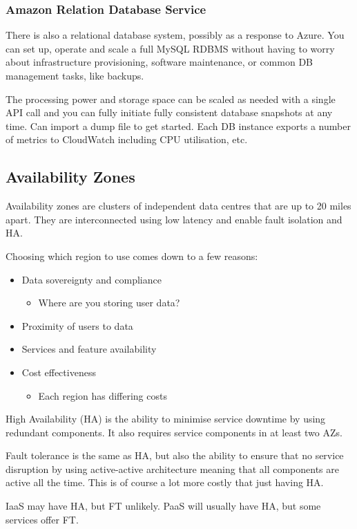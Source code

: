 \documentclass[11pt,a4paper,titlepage,dvipsnames,cmyk]{scrartcl}
\begin{document}
\subsubsection{Amazon Relation Database Service}
There is also a relational database system, possibly as a response to Azure. You can set up, operate and scale a full MySQL RDBMS without having to worry about infrastructure provisioning, software maintenance, or common DB management tasks, like backups.

The processing power and storage space can be scaled as needed with a single API call and you can fully initiate fully consistent database snapshots at any time. Can import a dump file to get started. Each DB instance exports a number of metrics to CloudWatch including CPU utilisation, etc.

\subsection{Availability Zones}
Availability zones are clusters of independent data centres that are up to 20 miles apart. They are interconnected using low latency and enable fault isolation and HA.

Choosing which region to use comes down to a few reasons:
\begin{itemize}
    \item Data sovereignty and compliance
    \begin{itemize}
        \item Where are you storing user data?
    \end{itemize}
    \item Proximity of users to data
    \item Services and feature availability
    \item Cost effectiveness
    \begin{itemize}
        \item Each region has differing costs
    \end{itemize}
\end{itemize}

High Availability (HA) is the ability to minimise service downtime by using redundant components. It also requires service components in at least two AZs.

Fault tolerance is the same as HA, but also the ability to ensure that no service disruption by using active-active architecture meaning that all components are active all the time. This is of course a lot more costly that just having HA.

IaaS may have HA, but FT unlikely. PaaS will usually have HA, but some services offer FT.
\end{document}
